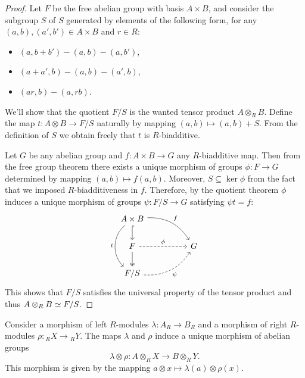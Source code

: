 \begin{proof}
    Let \(F\) be the free abelian group with basis \(A \times B\), and consider the
    subgroup \(S\) of \(S\) generated by elements of the following form, for any
    \((a, b), (a', b') \in A \times B\) and \(r \in R\):
    \begin{itemize}\setlength\itemsep{0em}
        \item \((a, b + b') - (a, b) - (a, b')\),
        \item \((a + a', b) - (a, b) - (a', b)\),
        \item \((a r, b) - (a, r b)\).
    \end{itemize}
    We'll show that the quotient \(F/S\) is the wanted tensor product
    \(A \otimes_R B\). Define the map \(t: A \otimes B \to F/S\)
    naturally by mapping \((a, b) \mapsto (a, b) + S\). From the definition of
    \(S\) we obtain freely that \(t\) is \(R\)-biadditive.

    Let \(G\) be any abelian group and \(f: A \times B \to G\) any \(R\)-biadditive
    map. Then from the free group theorem there exists a unique morphism of groups
    \(\phi: F \to G\) determined by mapping \((a, b) \mapsto f(a, b)\). Moreover,
    \(S \subseteq \ker \phi\) from the fact that we imposed \(R\)-biadditiveness in
    \(f\). Therefore, by the quotient theorem \(\phi\) induces a unique morphism of
    groups \(\psi: F/S \to G\) satisfying \(\psi t = f\):
    \[
        \begin{tikzcd}
            A \times B \ar[rrd, bend left, "f"]
            \ar[d, hook]
            \ar[dd, bend right=50, "t"']
            &&\\
            F \ar[rr, dashed, "\phi"]
            \ar[d, two heads]
            &&G \\
            F/S \ar[rru, bend right, "\psi"', dashed]
            &&
        \end{tikzcd}
    \]
    This shows that \(F/S\) satisfies the universal property of the tensor product
    and thus \(A \otimes_R B \simeq F/S\).
\end{proof}

\begin{proposition}
    \label{prop:tensoring-maps}
    Consider a morphism of left \(R\)-modules \(\lambda: A_R \to B_R\) and a
    morphism of right \(R\)-modules \(\rho: {}_RX \to {}_RY\). The maps \(\lambda\)
    and \(\rho\) induce a unique morphism of abelian groups
    \[
        \lambda \otimes \rho: A \otimes_R X \longrightarrow B \otimes_R Y.
    \]
    This morphism is given by the mapping
    \(a \otimes x \mapsto \lambda(a) \otimes \rho(x)\).
\end{proposition}

